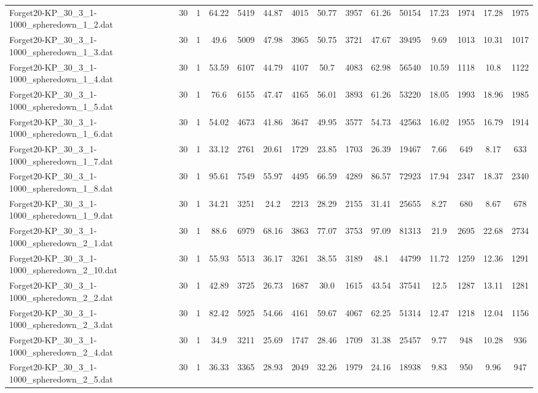 \begin{table}[!ht]
{\begin{tabular}{lcccccccccccccc}
Forget20-KP\_30\_3\_1-1000\_spheredown\_1\_2.dat & 30 & 1 & 64.22 & 5419 & 44.87 & 4015 & 50.77 & 3957 & 61.26 & 50154 & 17.23 & 1974 & 17.28 & 1975 \\
Forget20-KP\_30\_3\_1-1000\_spheredown\_1\_3.dat & 30 & 1 & 49.6 & 5009 & 47.98 & 3965 & 50.75 & 3721 & 47.67 & 39495 & 9.69 & 1013 & 10.31 & 1017 \\
Forget20-KP\_30\_3\_1-1000\_spheredown\_1\_4.dat & 30 & 1 & 53.59 & 6107 & 44.79 & 4107 & 50.7 & 4083 & 62.98 & 56540 & 10.59 & 1118 & 10.8 & 1122 \\
Forget20-KP\_30\_3\_1-1000\_spheredown\_1\_5.dat & 30 & 1 & 76.6 & 6155 & 47.47 & 4165 & 56.01 & 3893 & 61.26 & 53220 & 18.05 & 1993 & 18.96 & 1985 \\
Forget20-KP\_30\_3\_1-1000\_spheredown\_1\_6.dat & 30 & 1 & 54.02 & 4673 & 41.86 & 3647 & 49.95 & 3577 & 54.73 & 42563 & 16.02 & 1955 & 16.79 & 1914 \\
Forget20-KP\_30\_3\_1-1000\_spheredown\_1\_7.dat & 30 & 1 & 33.12 & 2761 & 20.61 & 1729 & 23.85 & 1703 & 26.39 & 19467 & 7.66 & 649 & 8.17 & 633 \\
Forget20-KP\_30\_3\_1-1000\_spheredown\_1\_8.dat & 30 & 1 & 95.61 & 7549 & 55.97 & 4495 & 66.59 & 4289 & 86.57 & 72923 & 17.94 & 2347 & 18.37 & 2340 \\
Forget20-KP\_30\_3\_1-1000\_spheredown\_1\_9.dat & 30 & 1 & 34.21 & 3251 & 24.2 & 2213 & 28.29 & 2155 & 31.41 & 25655 & 8.27 & 680 & 8.67 & 678 \\
Forget20-KP\_30\_3\_1-1000\_spheredown\_2\_1.dat & 30 & 1 & 88.6 & 6979 & 68.16 & 3863 & 77.07 & 3753 & 97.09 & 81313 & 21.9 & 2695 & 22.68 & 2734 \\
Forget20-KP\_30\_3\_1-1000\_spheredown\_2\_10.dat & 30 & 1 & 55.93 & 5513 & 36.17 & 3261 & 38.55 & 3189 & 48.1 & 44799 & 11.72 & 1259 & 12.36 & 1291 \\
Forget20-KP\_30\_3\_1-1000\_spheredown\_2\_2.dat & 30 & 1 & 42.89 & 3725 & 26.73 & 1687 & 30.0 & 1615 & 43.54 & 37541 & 12.5 & 1287 & 13.11 & 1281 \\
Forget20-KP\_30\_3\_1-1000\_spheredown\_2\_3.dat & 30 & 1 & 82.42 & 5925 & 54.66 & 4161 & 59.67 & 4067 & 62.25 & 51314 & 12.47 & 1218 & 12.04 & 1156 \\
Forget20-KP\_30\_3\_1-1000\_spheredown\_2\_4.dat & 30 & 1 & 34.9 & 3211 & 25.69 & 1747 & 28.46 & 1709 & 31.38 & 25457 & 9.77 & 948 & 10.28 & 936 \\
Forget20-KP\_30\_3\_1-1000\_spheredown\_2\_5.dat & 30 & 1 & 36.33 & 3365 & 28.93 & 2049 & 32.26 & 1979 & 24.16 & 18938 & 9.83 & 950 & 9.96 & 947 \\

\end{tabular}}
\end{table}
